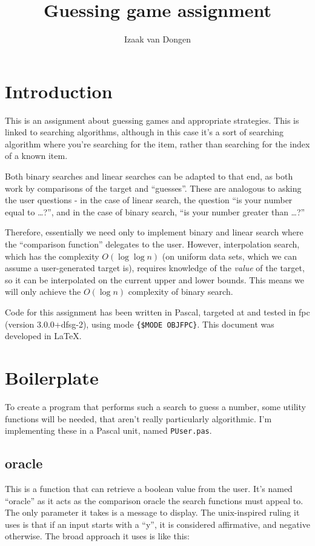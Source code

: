 \documentclass{article}
\title{Guessing game assignment}
\author{Izaak van Dongen}
\begin{document}
    \maketitle
    \tableofcontents
    \lstlistoflistings

    \section{Introduction}
    This is an assignment about guessing games and appropriate strategies. This
    is linked to searching algorithms, although in this case it's a sort of
    searching algorithm where you're searching for the item, rather than
    searching for the index of a known item.

    Both binary searches and linear
    searches can be adapted to that end, as both work by comparisons of the
    target and ``guesses''. These are analogous to asking the user questions - in
    the case of linear search, the question ``is your number equal to \ldots?'',
    and in the case of binary search, ``is your number greater than \ldots?''

    Therefore, essentially we need only to implement binary and linear search
    where the ``comparison function'' delegates to the user.  However,
    interpolation search, which has the complexity $O(\log\log n)$ (on uniform
    data sets, which we can assume a user-generated target is), requires
    knowledge of the \textit{value} of the target, so it can be interpolated on
    the current upper and lower bounds. This means we will only achieve the
    $O(\log n)$ complexity of binary search.

    Code for this assignment has been written in Pascal, targeted at and tested
    in fpc (version 3.0.0+dfsg-2), using mode \verb|{$MODE OBJFPC}|. This
    document was developed in \LaTeX.

    \section{Boilerplate}
    To create a program that performs such a search to guess a number, some
    utility functions will be needed, that aren't really particularly
    algorithmic. I'm implementing these in a Pascal unit, named
    \verb|PUser.pas|.

    \subsection{oracle}
    This is a function that can retrieve a boolean value from the user. It's
    named ``oracle'' as it acts as the comparison oracle the search functions
    must appeal to. The only parameter it takes is a message to display. The
    unix-inspired ruling it uses is that if an input starts with a ``y'', it is
    considered affirmative, and negative otherwise. The broad approach it uses
    is like this:
\end{document}
